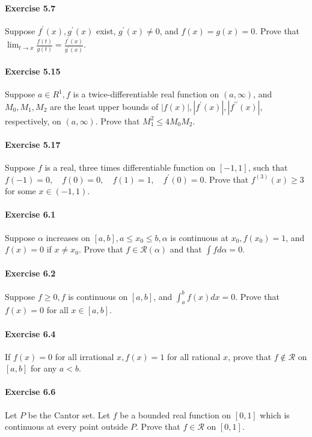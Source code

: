 \documentclass{article}
\begin{document}
\paragraph{Exercise 5.7} Suppose $f^{\prime}(x), g^{\prime}(x)$ exist, $g^{\prime}(x) \neq 0$, and $f(x)=g(x)=0$. Prove that $\lim _{t \rightarrow x} \frac{f(t)}{g(t)}=\frac{f^{\prime}(x)}{g^{\prime}(x)}.$

\paragraph{Exercise 5.15} Suppose $a \in R^{1}, f$ is a twice-differentiable real function on $(a, \infty)$, and $M_{0}, M_{1}, M_{2}$ are the least upper bounds of $|f(x)|,\left|f^{\prime}(x)\right|,\left|f^{\prime \prime}(x)\right|$, respectively, on $(a, \infty)$. Prove that $M_{1}^{2} \leq 4 M_{0} M_{2} .$

\paragraph{Exercise 5.17} Suppose $f$ is a real, three times differentiable function on $[-1,1]$, such that $f(-1)=0, \quad f(0)=0, \quad f(1)=1, \quad f^{\prime}(0)=0 .$ Prove that $f^{(3)}(x) \geq 3$ for some $x \in(-1,1)$.

\paragraph{Exercise 6.1} Suppose $\alpha$ increases on $[a, b], a \leq x_{0} \leq b, \alpha$ is continuous at $x_{0}, f\left(x_{0}\right)=1$, and $f(x)=0$ if $x \neq x_{0}$. Prove that $f \in \mathcal{R}(\alpha)$ and that $\int f d \alpha=0$.

\paragraph{Exercise 6.2} Suppose $f \geq 0, f$ is continuous on $[a, b]$, and $\int_{a}^{b} f(x) d x=0$. Prove that $f(x)=0$ for all $x \in[a, b]$.

\paragraph{Exercise 6.4} If $f(x)=0$ for all irrational $x, f(x)=1$ for all rational $x$, prove that $f \notin \mathcal{R}$ on $[a, b]$ for any $a<b$.

\paragraph{Exercise 6.6} Let $P$ be the Cantor set. Let $f$ be a bounded real function on $[0,1]$ which is continuous at every point outside $P$. Prove that $f \in \mathcal{R}$ on $[0,1]$.
\end{document}
